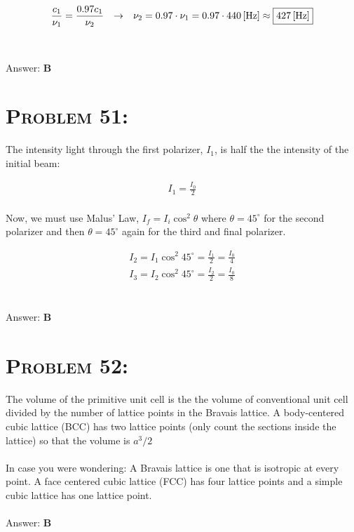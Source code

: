 \documentclass{article}
\begin{document}
\begin{gather}
\frac{c_{1}}{\nu_{1}} = \frac{0.97 c_{1}}{\nu_{2}} \hspace{.1in} \rightarrow \hspace{.1in} \nu_{2} = 0.97 \cdot \nu_{1} = 0.97 \cdot \unit[440]{[Hz]} \approx \boxed{\unit[427]{[Hz]}}\nonumber
\end{gather}
\\\\
Answer: \textbf{\textcolor{ProcessBlue}B}\\


\section{\textsc{Problem 51:}} The intensity light through the first polarizer, $I_{1}$, is half the the intensity of the initial beam:

\begin{gather}
I_{1} = \frac{I_{0}}{2}
\end{gather}
\\
Now, we must use Malus' Law, $I_{f} = I_{i} \cos^{2}{\theta}$ where $\theta = 45^{\circ}$ for the second polarizer and then $\theta = 45^{\circ}$ again for the third and final polarizer.

\begin{gather}
I_{2} = I_{1} \cos^{2}{45^{\circ}} = \frac{I_{1}}{2} = \frac{I_{0}}{4}\nonumber\\
I_{3} = I_{2} \cos^{2}{45^{\circ}} = \frac{I_{2}}{2} = \boxed{\frac{I_{0}}{8}}\nonumber
\end{gather}
\\\\
Answer: \textbf{\textcolor{ProcessBlue}B}\\


\section{\textsc{Problem 52:}} The volume of the primitive unit cell is the the volume of conventional unit cell divided by the number of lattice points in the Bravais lattice. A body-centered cubic lattice (BCC) has two lattice points (only count the sections inside the lattice) so that the volume is $\boxed{a^{3}/2}$\\
\\
In case you were wondering: A Bravais lattice is one that is isotropic at every point. A face centered cubic lattice (FCC) has four lattice points and a simple cubic lattice has one lattice point.
\\\\
Answer: \textbf{\textcolor{ProcessBlue}B}\\
\end{document}
